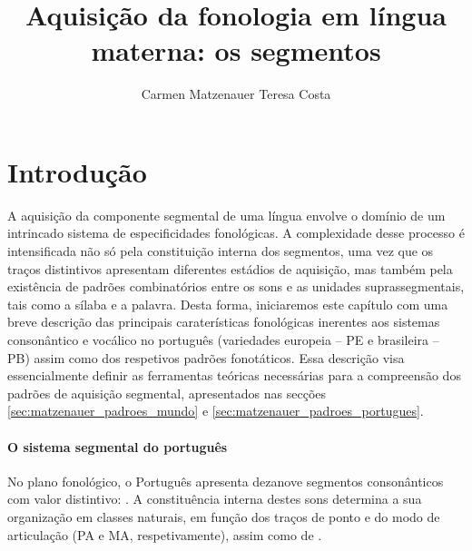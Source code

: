 \documentclass[output=paper]{LSP/langsci}
\author{Carmen Matzenauer\affiliation{Universidade
Católica de Pelotas}\lastand 
Teresa Costa\affiliation{Universidade de Lisboa, Centro de Linguística}
}
\title{Aquisição da fonologia em língua materna: os segmentos}
\begin{document}
\section{Introdução}
\label{sec:matzenauer_intro}

A aquisição da componente segmental de uma língua envolve o domínio de um intrincado sistema de especificidades fonológicas. A complexidade desse processo é intensificada não só pela constituição interna dos segmentos, uma vez que os traços distintivos apresentam diferentes estádios de aquisição, mas também pela existência de padrões combinatórios entre os sons e as unidades suprassegmentais, tais como a sílaba e a palavra. Desta forma, iniciaremos este capítulo com uma breve descrição das principais caraterísticas fonológicas inerentes aos sistemas consonântico e vocálico no português (variedades europeia -- PE e brasileira -- PB) assim como dos respetivos padrões fonotáticos. Essa descrição visa essencialmente definir as ferramentas teóricas necessárias para a compreensão dos padrões de aquisição segmental, apresentados nas secções \ref{sec:matzenauer_padroes_mundo} e \ref{sec:matzenauer_padroes_portugues}.

\paragraph*{O sistema segmental do português}

No plano fonológico, o Português apresenta dezanove segmentos consonânticos com valor distintivo: . A constituência interna destes sons determina a sua organização em classes naturais, em função dos traços de ponto e do modo de articulação (PA e MA, respetivamente), assim como de .
\end{document}
